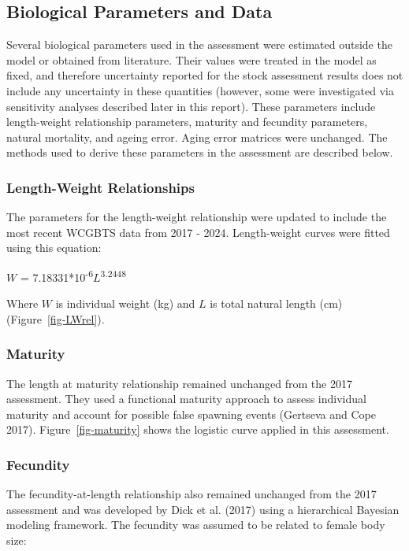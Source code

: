 \documentclass[
]{scrartcl}
\begin{document}
\subsection{Biological Parameters and
Data}\label{biological-parameters-and-data}

Several biological parameters used in the assessment were estimated
outside the model or obtained from literature. Their values were treated
in the model as fixed, and therefore uncertainty reported for the stock
assessment results does not include any uncertainty in these quantities
(however, some were investigated via sensitivity analyses described
later in this report). These parameters include length-weight
relationship parameters, maturity and fecundity parameters, natural
mortality, and ageing error. Aging error matrices were unchanged. The
methods used to derive these parameters in the assessment are described
below.

\subsubsection{Length-Weight
Relationships}\label{length-weight-relationships}

The parameters for the length-weight relationship were updated to
include the most recent WCGBTS data from 2017 - 2024. Length-weight
curves were fitted using this equation:

\(W\) = 7.18331*10\textsuperscript{-6}\(L\)\textsuperscript{3.2448}

Where \(W\) is individual weight (kg) and \(L\) is total natural length
(cm) (Figure~\ref{fig-LWrel}).

\subsubsection{Maturity}\label{maturity}

The length at maturity relationship remained unchanged from the 2017
assessment. They used a functional maturity approach to assess
individual maturity and account for possible false spawning events
(Gertseva and Cope 2017). Figure~\ref{fig-maturity} shows the logistic
curve applied in this assessment.

\subsubsection{Fecundity}\label{fecundity}

The fecundity-at-length relationship also remained unchanged from the
2017 assessment and was developed by Dick et al. (2017) using a
hierarchical Bayesian modeling framework. The fecundity was assumed to
be related to female body size:
\end{document}
